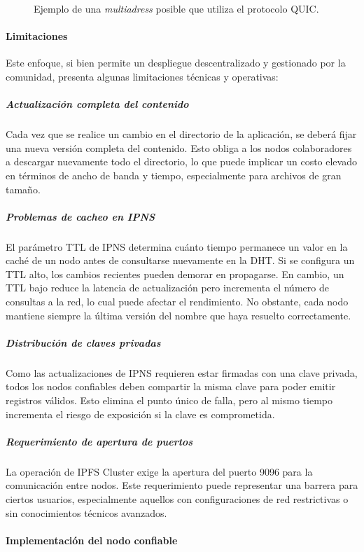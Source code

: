 \begin{figure}[H]
\centering
{}
\caption{Ejemplo de una \textit{multiadress} posible que utiliza el protocolo QUIC.}
\end{figure}

\paragraph{Limitaciones}

Este enfoque, si bien permite un despliegue descentralizado y gestionado por la comunidad, presenta algunas limitaciones técnicas y operativas:

\subparagraph{Actualización completa del contenido} Cada vez que se realice un cambio en el directorio de la aplicación, se deberá fijar una nueva versión completa del contenido. Esto obliga a los nodos colaboradores a descargar nuevamente todo el directorio, lo que puede implicar un costo elevado en términos de ancho de banda y tiempo, especialmente para archivos de gran tamaño.

\subparagraph{Problemas de cacheo en IPNS} El parámetro TTL de IPNS determina cuánto tiempo permanece un valor en la caché de un nodo antes de consultarse nuevamente en la DHT. Si se configura un TTL alto, los cambios recientes pueden demorar en propagarse. En cambio, un TTL bajo reduce la latencia de actualización pero incrementa el número de consultas a la red, lo cual puede afectar el rendimiento. No obstante, cada nodo mantiene siempre la última versión del nombre que haya resuelto correctamente.

\subparagraph{Distribución de claves privadas} Como las actualizaciones de IPNS requieren estar firmadas con una clave privada, todos los nodos confiables deben compartir la misma clave para poder emitir registros válidos. Esto elimina el punto único de falla, pero al mismo tiempo incrementa el riesgo de exposición si la clave es comprometida.

\subparagraph{Requerimiento de apertura de puertos} La operación de IPFS Cluster exige la apertura del puerto 9096 para la comunicación entre nodos. Este requerimiento puede representar una barrera para ciertos usuarios, especialmente aquellos con configuraciones de red restrictivas o sin conocimientos técnicos avanzados.

\paragraph{Implementación del nodo confiable}

